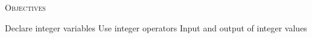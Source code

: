 


\renewcommand\TITLE{Assignment 3}
\usepackage{import}


\topmatter

\textsc{Objectives}
 \begin{myenum}
   \li Declare integer variables
   \li Use integer operators
   \li Input and output of integer values
 \end{myenum}




